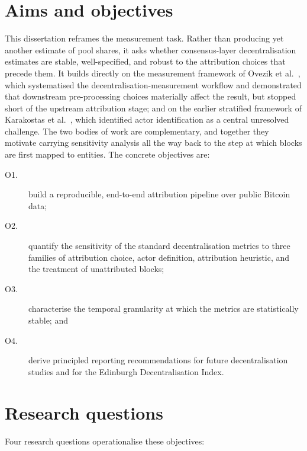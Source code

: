 \documentclass[logo,msc]{infthesis}           %
\begin{document}
\section{Aims and objectives}
\label{sec:intro-aims}
 
This dissertation reframes the measurement task. Rather than producing yet
another estimate of pool shares, it asks whether consensus-layer
decentralisation estimates are stable, well-specified, and robust to the
attribution choices that precede them. It builds directly on the measurement
framework of Ovezik et al.~\cite{ovezik2025sok}, which systematised the
decentralisation-measurement workflow and demonstrated that downstream
pre-processing choices materially affect the result, but stopped short of the
upstream attribution stage; and on the earlier stratified framework of
Karakostas et al.~\cite{ovezik2022sok}, which identified actor identification
as a central unresolved challenge. The two bodies of work are complementary,
and together they motivate carrying sensitivity analysis all the way back to
the step at which blocks are first mapped to entities. The concrete objectives
are:
 
\begin{description}
  \item[O1.] build a reproducible, end-to-end attribution pipeline over public
    Bitcoin data;
  \item[O2.] quantify the sensitivity of the standard decentralisation metrics
    to three families of attribution choice, actor definition, attribution
    heuristic, and the treatment of unattributed blocks;
  \item[O3.] characterise the temporal granularity at which the metrics are
    statistically stable; and
  \item[O4.] derive principled reporting recommendations for future
    decentralisation studies and for the Edinburgh Decentralisation Index.
\end{description}
 
\section{Research questions}
\label{sec:intro-rqs}
 
Four research questions operationalise these objectives:
 
\end{document}

